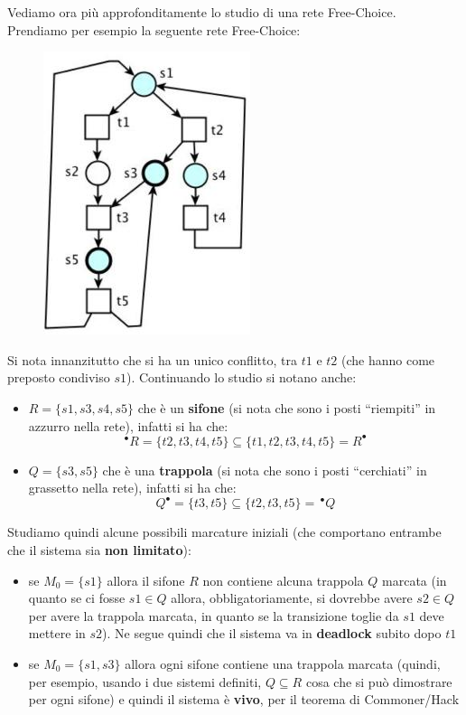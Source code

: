 \documentclass[a4paper,12pt, oneside]{book}
\begin{document}
\newpage
\begin{esempio}
  Vediamo ora più approfonditamente lo studio di una rete Free-Choice.\\
  Prendiamo per esempio la seguente rete Free-Choice:
  \begin{figure}[H]
    \centering
    \includegraphics[scale = 0.6]{img/fc8.jpg} 
  \end{figure}
  Si nota innanzitutto che si ha un unico conflitto, tra $t1$ e $t2$ (che hanno
  come preposto condiviso $s1$). Continuando lo studio si notano anche:
  \begin{itemize}
    \item $R=\{s1 , s3 , s4 , s5\}$ che è un \textbf{sifone} (si nota che sono i
    posti ``riempiti'' in azzurro nella rete), infatti si ha che:
    \[^\bullet R=\{t2 , t3 , t4 , t5\}\subseteq\{t1, t2 , t3 , t4 ,
      t5\}=R^\bullet\]
    \item $Q = \{s3 , s5 \}$ che è una \textbf{trappola} (si nota che sono i
    posti ``cerchiati'' in grassetto nella rete), infatti si ha che:
    \[Q^\bullet=\{t3,t5\}\subseteq\{t2,t3,t5\}=\,^\bullet Q\]
  \end{itemize}
  Studiamo quindi alcune possibili marcature iniziali (che comportano entrambe
  che il sistema sia \textbf{non limitato}):
  \begin{itemize}
    \item se $M_0=\{s1\}$ allora il sifone $R$ non contiene alcuna trappola $Q$
    marcata (in quanto se ci fosse $s1\in Q$ allora, obbligatoriamente, si
    dovrebbe avere $s2\in Q$ per avere la trappola marcata, in quanto se la
    transizione toglie da $s1$ deve mettere in $s2$). Ne segue quindi che
    il sistema va in \textbf{deadlock} subito dopo $t1$
    \item se $M_0=\{s1,s3\}$ allora ogni sifone contiene una trappola marcata
    (quindi, per esempio, usando i due sistemi definiti, $Q\subseteq R$ cosa che
    si può dimostrare per ogni sifone) e quindi il sistema è \textbf{vivo}, per
    il teorema di Commoner/Hack
  \end{itemize}
\end{esempio}
\end{document}
